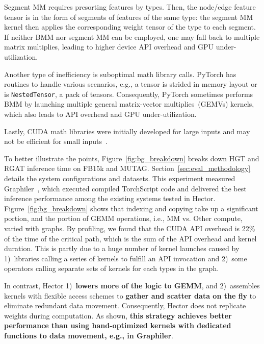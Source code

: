 Segment MM requires presorting features by types. Then,  the node/edge feature tensor is in the form of segments of features of the same type: the segment MM kernel then applies the corresponding weight tensor of the type to each segment. 
If neither BMM nor segment MM can be employed, one may fall back to multiple matrix multiplies, leading to higher device API overhead and GPU under-utilization.




Another type of inefficiency is suboptimal math library calls. PyTorch has routines to handle various scenarios, e.g., a tensor is strided in memory layout or is \texttt{NestedTensor}, a pack of tensors. Consequently, PyTorch sometimes performs BMM by launching multiple general matrix-vector multiplies~(GEMVs) kernels, which also leads to API overhead and GPU under-utilization. 



Lastly,  CUDA math libraries were initially developed for large inputs and may not be {efficient} for small inputs~\cite{nvidiaCublasgemmBatchedCuBLASDocuemntation}.

To better illustrate the points, Figure~\ref{fig:bg_breakdown} breaks down HGT and RGAT inference time on FB15k and MUTAG.
Section~\ref{sec:eval_methodology} details the system configurations and datasets.
This experiment measured Graphiler~\cite{xieGraphilerCompilerGraph}, which executed compiled TorchScript code and delivered the best inference performance among the existing systems tested in Hector.
Figure~\ref{fig:bg_breakdown} shows that indexing and copying take up a significant portion, and the portion of GEMM operations, i.e., MM vs. Other compute,  varied with graphs.
By profiling, we found that the CUDA API overhead is 22\% of the time of the critical path, which is the sum of the API overhead and kernel duration. This is partly due to a huge number of kernel launches caused by 1)~libraries calling a series of kernels to fulfill an API invocation and 2)~some operators calling separate sets of kernels for each types in the graph.



In contrast, Hector 1)~\textbf{lowers more of the logic to GEMM}, 
and 2)~assembles kernels with flexible access schemes to \textbf{gather and scatter data on the fly} to eliminate redundant data movement. Consequently, Hector does not replicate weights during computation. As shown, \textbf{this strategy achieves better performance than using hand-optimized kernels with dedicated functions to data movement, e.g., in Graphiler}.




